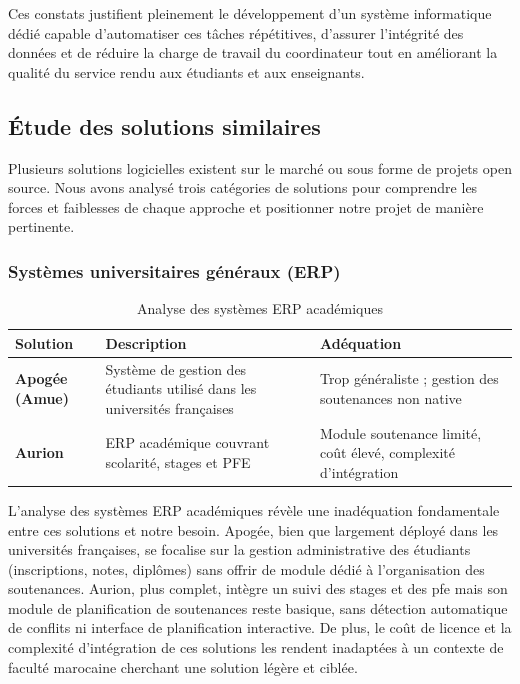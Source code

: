 Ces constats justifient pleinement le développement d'un système informatique dédié capable d'automatiser ces tâches répétitives, d'assurer l'intégrité des données et de réduire la charge de travail du coordinateur tout en améliorant la qualité du service rendu aux étudiants et aux enseignants.

\subsection{Étude des solutions similaires}
\label{ch2:solutions_similaires}

Plusieurs solutions logicielles existent sur le marché ou sous forme de projets open source. Nous avons analysé trois catégories de solutions pour comprendre les forces et faiblesses de chaque approche et positionner notre projet de manière pertinente.

\subsubsection{Systèmes universitaires généraux (ERP)}
\label{ch2:erp}

\begin{table}[H]
    \centering
    \small
    \begin{xltabular}{\textwidth}{lXX}
        \toprule

        \textbf{Solution}                                                        & \textbf{Description} & \textbf{Adéquation} \\
        \midrule
        \textbf{Apogée (Amue)}                                                   &
        Système de gestion des étudiants utilisé dans les universités françaises &
        Trop généraliste ; gestion des soutenances non native                                                                 \\
        \addlinespace
        \textbf{Aurion}                                                          &
        ERP académique couvrant scolarité, stages et PFE                         &
        Module soutenance limité, coût élevé, complexité d'intégration                                                        \\
        \bottomrule
    \end{xltabular}
    \caption{Analyse des systèmes ERP académiques}
    \label{tab:erp}
\end{table}

L'analyse des systèmes ERP académiques révèle une inadéquation fondamentale entre ces solutions et notre besoin. Apogée, bien que largement déployé dans les universités françaises, se focalise sur la gestion administrative des étudiants (inscriptions, notes, diplômes) sans offrir de module dédié à l'organisation des soutenances. Aurion, plus complet, intègre un suivi des stages et des \acrshort{pfe} mais son module de planification de soutenances reste basique, sans détection automatique de conflits ni interface de planification interactive. De plus, le coût de licence et la complexité d'intégration de ces solutions les rendent inadaptées à un contexte de faculté marocaine cherchant une solution légère et ciblée.

